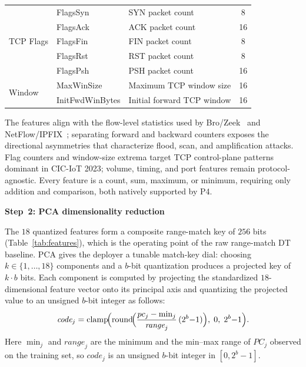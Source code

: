 \documentclass[runningheads]{llncs}
\begin{document}
\begin{table}[!t]
\begin{tabular}{lllc}
\midrule
\multirow{5}{*}{TCP Flags}
          & FlagsSyn         & SYN packet count                   & 8  \\
          & FlagsAck         & ACK packet count                   & 16 \\
          & FlagsFin         & FIN packet count                   & 8  \\
          & FlagsRst         & RST packet count                   & 8  \\
          & FlagsPsh         & PSH packet count                   & 16 \\
\midrule
\multirow{2}{*}{Window}
          & MaxWinSize       & Maximum TCP window size            & 16 \\
          & InitFwdWinBytes  & Initial forward TCP window         & 16 \\
\bottomrule
\end{tabular}
\end{table}


The features align with the flow-level statistics used by Bro/Zeek~\cite{Paxson1998} and NetFlow/IPFIX~\cite{Hofstede20142037}; separating forward and backward counters exposes the directional asymmetries that characterize flood, scan, and amplification attacks. Flag counters and window-size extrema target TCP control-plane patterns dominant in CIC-IoT 2023; volume, timing, and port features remain protocol-agnostic. Every feature is a count, sum, maximum, or minimum, requiring only addition and comparison, both natively supported by P4.

\noindent\textbf{Step~2: PCA dimensionality reduction}

The $18$ quantized features form a composite range-match key of $256$ bits (Table~\ref{tab:features}), which is the operating point of the raw range-match DT baseline. PCA gives the deployer a tunable match-key dial: choosing $k\!\in\!\{1,\dots,18\}$ components and a $b$-bit quantization produces a projected key of $k\!\cdot\!b$ bits. Each component is computed by projecting the standardized $18$-dimensional feature vector onto its principal axis and quantizing the projected value to an unsigned $b$-bit integer as follows:
\begin{equation}\label{eq:quantize}
\textit{code}_j = \mathrm{clamp}\!\Bigl(\mathrm{round}\!\Bigl(\frac{pc_j - \min_j}{\textit{range}_j}\,(2^b{-}1)\Bigr),\;0,\;2^b{-}1\Bigr).
\end{equation}
Here $\min_j$ and $\textit{range}_j$ are the minimum and the min--max range of $PC_j$ observed on the training set, so $\textit{code}_j$ is an unsigned $b$-bit integer in $[0, 2^b{-}1]$.
\end{document}
